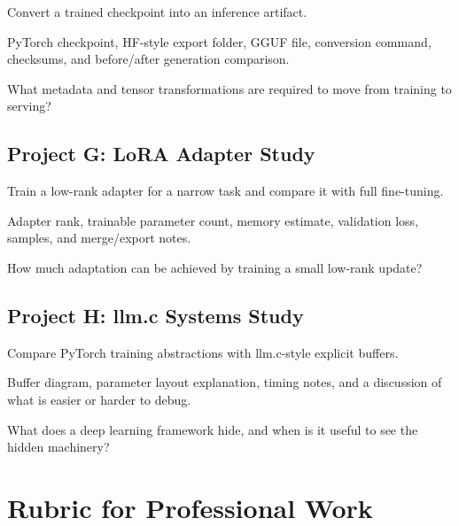  Convert a trained checkpoint into an inference artifact.

 PyTorch checkpoint, HF-style export folder, GGUF file, conversion command, checksums, and before/after generation comparison.

 What metadata and tensor transformations are required to move from training to serving?

\subsection*{Project G: LoRA Adapter Study}

 Train a low-rank adapter for a narrow task and compare it with full fine-tuning.

 Adapter rank, trainable parameter count, memory estimate, validation loss, samples, and merge/export notes.

 How much adaptation can be achieved by training a small low-rank update?

\subsection*{Project H: llm.c Systems Study}

 Compare PyTorch training abstractions with llm.c-style explicit buffers.

 Buffer diagram, parameter layout explanation, timing notes, and a discussion of what is easier or harder to debug.

 What does a deep learning framework hide, and when is it useful to see the hidden machinery?

\section{Rubric for Professional Work}

